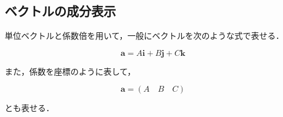 \documentclass[a4paper,11pt]{ltjsarticle}
\numberwithin{equation}{section}
\begin{document}
\subsection{ベクトルの成分表示}

単位ベクトルと係数倍を用いて，一般にベクトルを次のような式で表せる．

\begin{equation}
  \bm{a}=A \bm{i}+B \bm{j}+C \bm{k}
\end{equation}

また，係数を座標のように表して，

\begin{equation}
  \bm{a}=(A \quad B \quad C)
\end{equation}

とも表せる．

\clearpage


\lhead{}


\nocite{*}

\printindex
\end{document}
